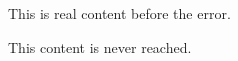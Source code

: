 \documentclass{article}
\begin{document}
This is real content before the error.



This content is never reached.
\end{document}

